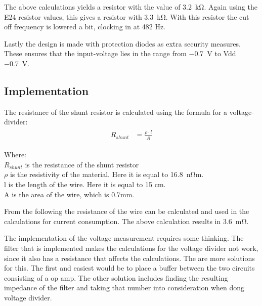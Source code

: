 The above calculations yields a resistor with the value of \SI{3.2}{\kilo \ohm}. Again using the E24 resistor values, this gives a resistor with \SI{3.3}{\kilo \ohm}. With this resistor the cut off frequency is lowered a bit, clocking in at 482 Hz.

Lastly the design is made with protection diodes as extra security measures. These ensures that the input-voltage lies in the range from \SI{-0.7}{\volt} to Vdd \SI{-0.7}{\volt}. 

\newpage
\subsection{Implementation}
The resistance of the shunt resistor is calculated using the formula for a voltage-divider:
\begin{align}
	\begin{split}
		R_{shunt} &= \frac{\rho \cdot l}{A}
	\end{split}
\end{align}

Where:\\
$R_{shunt}$ is the resistance of the shunt resistor\\
$\rho$ is the resistivity of the material. Here it is equal to \SI{16.8}{\nano \ohm}m.\\
l is the length of the wire. Here it is equal to 15 cm.\\
A is the area of the wire, which is 0.7mm.

From the following the resistance of the wire can be calculated and used in the calculations for current consumption. The above calculation results in \SI{3.6}{\milli \ohm}.

The implementation of the voltage measurement requires some thinking. The filter that is implemented makes the calculations for the voltage divider not work, since it also has a resistance that affects the calculations. The are more solutions for this. The first and easiest would be to place a buffer between the two circuits consisting of a op amp. The other solution includes finding the resulting impedance of the filter and taking that number into consideration when dong voltage divider. 